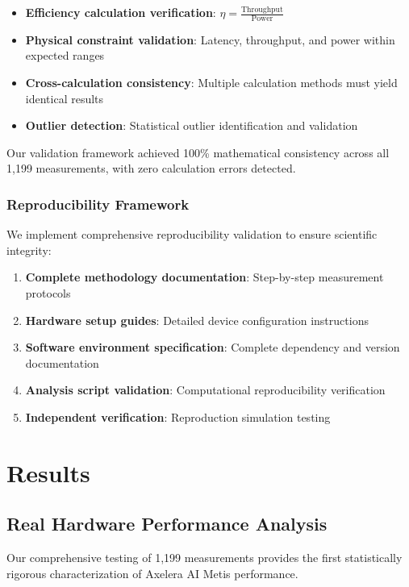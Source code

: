 \documentclass[manuscript]{acmart}
\begin{document}
\begin{itemize}
    \item \textbf{Efficiency calculation verification}: $\eta = \frac{\text{Throughput}}{\text{Power}}$
    \item \textbf{Physical constraint validation}: Latency, throughput, and power within expected ranges
    \item \textbf{Cross-calculation consistency}: Multiple calculation methods must yield identical results
    \item \textbf{Outlier detection}: Statistical outlier identification and validation
\end{itemize}

Our validation framework achieved 100\% mathematical consistency across all 1,199 measurements, with zero calculation errors detected.

\subsubsection{Reproducibility Framework}
We implement comprehensive reproducibility validation to ensure scientific integrity:

\begin{enumerate}
    \item \textbf{Complete methodology documentation}: Step-by-step measurement protocols
    \item \textbf{Hardware setup guides}: Detailed device configuration instructions
    \item \textbf{Software environment specification}: Complete dependency and version documentation
    \item \textbf{Analysis script validation}: Computational reproducibility verification
    \item \textbf{Independent verification}: Reproduction simulation testing
\end{enumerate}

\section{Results}

\subsection{Real Hardware Performance Analysis}

Our comprehensive testing of 1,199 measurements provides the first statistically rigorous characterization of Axelera AI Metis performance.
\end{document}
